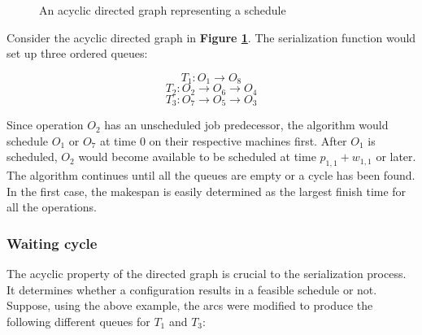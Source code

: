 \documentclass[a4paper,10pt]{article}
\begin{document}
\begin{figure}[h]
\centering
{}
\caption{An acyclic directed graph representing a schedule}
\label{fig:dag}
\end{figure}

Consider the acyclic directed graph in \textbf{Figure \ref{fig:dag}}. The serialization function would set up three ordered queues:

\[ T_1\colon O_1 \rightarrow O_8 \]
\[ T_2\colon O_2 \rightarrow O_6 \rightarrow O_4 \]
\[ T_3\colon O_7 \rightarrow O_5 \rightarrow O_3 \]

Since operation $O_2$ has an unscheduled job predecessor, the algorithm would schedule $O_1$ or $O_7$ at time 0 on their respective machines first. After $O_1$ is scheduled, $O_2$ would become available to be scheduled at time $p_{1,1} + w_{1,1}$ or later. The algorithm continues until all the queues are empty or a cycle has been found. In the first case, the makespan is easily determined as the largest finish time for all the operations.

\subsubsection{Waiting cycle}

The acyclic property of the directed graph is crucial to the serialization process. It determines whether a configuration results in a feasible schedule or not. Suppose, using the above example, the arcs were modified to produce the following different queues for $T_1$ and $T_3$:
\end{document}
